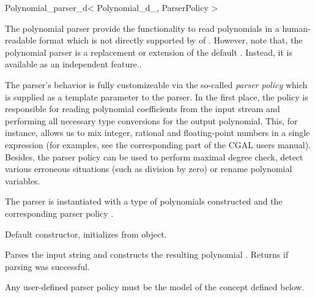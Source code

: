 % 
% 

\begin{ccRefClass}{Polynomial_parser_d< Polynomial_d_, ParserPolicy >}
\def\ccTagOperatorLayout{\ccFalse}


\ccDefinition

The polynomial parser provide the functionality to read polynomials in a human-readable format which
is not directly supported by  of . However, note that,
the polynomial parser is  a replacement or extension of the default . Instead,
it is available as an independent feature..

The parser's behavior is fully customizeable via the so-called {\em parser policy} 
which is supplied as a template parameter to the parser. 
In the first place, the policy is responsible for reading polynomial 
coefficients from the input stream and performing all necessary type conversions
for the output polynomial. This, for instance, allows us to mix integer, rational and 
floating-point numbers in a single expression (for examples, see the corresponding part of 
the CGAL users manual).
Besides, the parser policy can be used to perform maximal degree check,
detect various erroneous situations (such as division by zero) 
or rename polynomial variables.

\ccParameters
The parser is instantiated with a type 
of polynomials constructed  and the corresponding parser policy . 


\ccCreation
{}

% 

{Default constructor, initializes from  object.}

\ccOperations

{Parses the input string  and constructs the resulting polynomial . 
Returns  if parsing was successful.} 

Any user-defined parser policy must be the model of the 
concept defined below.
\end{ccRefClass}

